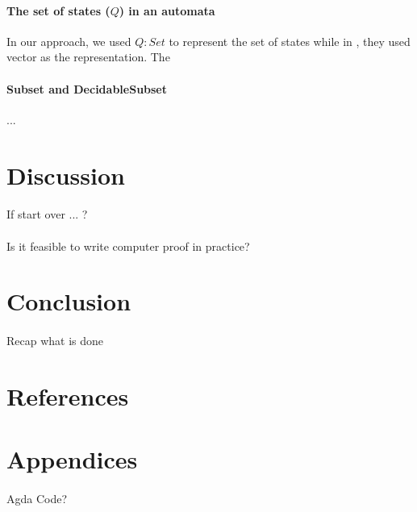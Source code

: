 \documentclass[twoside,openright,final]{bhamthesis}
\begin{document}
\paragraph{The set of states (\(Q\)) in an automata} In our approach,
we used \(Q : Set\) to represent the set of states while in
\cite{firsov2013}, they used vector as the representation. The 


\paragraph{Subset and DecidableSubset} ...


\newpage
\section{Discussion}
\paragraph{} If start over ... ?

\paragraph{} Is it feasible to write computer proof in practice?

\newpage
\section{Conclusion}
\paragraph{} Recap what is done

\newpage
\section*{References}



\newpage
\section*{Appendices}
\paragraph{} Agda Code?
\end{document}
